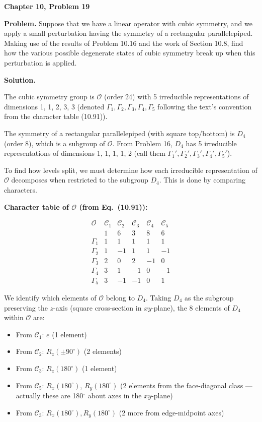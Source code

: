 \documentclass[12pt]{article}
\begin{document}
\begin{center}
{\Large\bfseries Chapter 10, Problem 19}
\end{center}

\noindent\textbf{Problem.} Suppose that we have a linear operator with cubic symmetry, and we apply a small perturbation having the symmetry of a rectangular parallelepiped. Making use of the results of Problem 10.16 and the work of Section 10.8, find how the various possible degenerate states of cubic symmetry break up when this perturbation is applied.

\bigskip
\noindent\textbf{Solution.}

The cubic symmetry group is $\mathscr{O}$ (order 24) with 5 irreducible representations of dimensions 1, 1, 2, 3, 3 (denoted $\Gamma_1, \Gamma_2, \Gamma_3, \Gamma_4, \Gamma_5$ following the text's convention from the character table (10.91)).

The symmetry of a rectangular parallelepiped (with square top/bottom) is $D_4$ (order 8), which is a subgroup of $\mathscr{O}$. From Problem 16, $D_4$ has 5 irreducible representations of dimensions 1, 1, 1, 1, 2 (call them $\Gamma_1', \Gamma_2', \Gamma_3', \Gamma_4', \Gamma_5'$).

To find how levels split, we must determine how each irreducible representation of $\mathscr{O}$ decomposes when restricted to the subgroup $D_4$. This is done by comparing characters.

\medskip
\noindent\textbf{Character table of $\mathscr{O}$ (from Eq.~(10.91)):}

\[
\begin{array}{c|ccccc}
\mathscr{O} & \mathcal{C}_1 & \mathcal{C}_2 & \mathcal{C}_3 & \mathcal{C}_4 & \mathcal{C}_5 \\
& 1 & 6 & 3 & 8 & 6 \\
\hline
\Gamma_1 & 1 & 1 & 1 & 1 & 1 \\
\Gamma_2 & 1 & -1 & 1 & 1 & -1 \\
\Gamma_3 & 2 & 0 & 2 & -1 & 0 \\
\Gamma_4 & 3 & 1 & -1 & 0 & -1 \\
\Gamma_5 & 3 & -1 & -1 & 0 & 1
\end{array}
\]

We identify which elements of $\mathscr{O}$ belong to $D_4$. Taking $D_4$ as the subgroup preserving the $z$-axis (square cross-section in $xy$-plane), the 8 elements of $D_4$ within $\mathscr{O}$ are:
\begin{itemize}
\item From $\mathcal{C}_1$: $e$ (1 element)
\item From $\mathcal{C}_2$: $R_z(\pm 90^\circ)$ (2 elements)
\item From $\mathcal{C}_3$: $R_z(180^\circ)$ (1 element)
\item From $\mathcal{C}_5$: $R_x(180^\circ)$, $R_y(180^\circ)$ (2 elements from the face-diagonal class --- actually these are 180$^\circ$ about axes in the $xy$-plane)
\item From $\mathcal{C}_3$: $R_x(180^\circ), R_y(180^\circ)$ (2 more from edge-midpoint axes)
\end{itemize}
\end{document}
